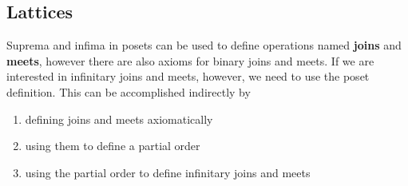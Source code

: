\subsection{Lattices}\label{sec:lattices}

\begin{note}\label{note:infinite_join_meet}
  Suprema and infima in posets can be used to define operations named \textbf{joins} and \textbf{meets}, however there are also axioms for binary joins and meets. If we are interested in infinitary joins and meets, however, we need to use the poset definition. This can be accomplished indirectly by
  \begin{enumerate}
    \item defining joins and meets axiomatically
    \item using them to define a partial order
    \item using the partial order to define infinitary joins and meets
  \end{enumerate}
\end{note}

